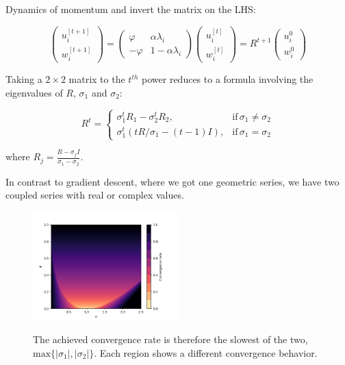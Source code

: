 \documentclass[11pt,compress,t,notes=noshow, xcolor=table]{beamer}
\begin{document}
\begin{vbframe}{Dynamics of momentum}
and invert the matrix on the LHS: 

\begin{equation*}
\begin{pmatrix}
		u_i^{[ t+1 ] } \\
		w_i^{[ t+1 ] }
	\end{pmatrix} = 
	\begin{pmatrix}
		\varphi & \alpha \lambda_i \\
		-\varphi & 1 - \alpha \lambda_i
	\end{pmatrix}  \begin{pmatrix}
		u_i^{[ t ] } \\
		w_i^{[ t ] }
	\end{pmatrix} = R^{ t+1 }  \begin{pmatrix}
	u_i^{0} \\
	w_i^{0}
\end{pmatrix}
\end{equation*}

\framebreak

Taking a $2 \times 2$ matrix to the $t^{th}$ power reduces to a formula involving the eigenvalues of $R$, $\sigma_1$ and $\sigma_2$:

$$
R^t=\begin{cases}
\sigma_1^t R_1 - \sigma_2^t R_2, & \text{if} \, \sigma_1 \neq \sigma_2 \\
\sigma_1^t (t R/\sigma_1 - (t-1) I), & \text{if} \, \sigma_1 = \sigma_2 
\end{cases}
$$

where $R_j = \frac{R - \sigma_j I}{\sigma_1 - \sigma_2}$.


\vspace*{1.5cm}	
In contrast to gradient descent, where we got one geometric series, we have two coupled series with real or complex values.

\framebreak
\begin{figure}
	\includegraphics[width=0.5\textwidth, keepaspectratio]{figure_man/momentum_convergence.png} \\
	\begin{footnotesize} 
		The achieved convergence rate is therefore the slowest of the two, $\text{max} \{|\sigma_1|, |\sigma_2| \}$. Each region shows a different convergence behavior. 
	\end{footnotesize}
\end{figure}


\end{vbframe}
\end{document}
